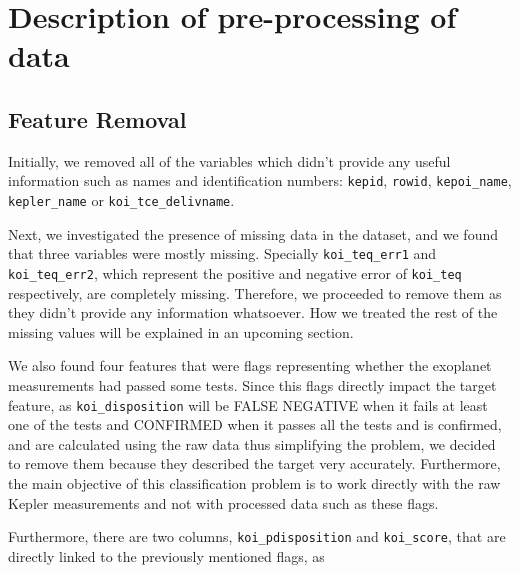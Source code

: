 
\section{Description of pre-processing of data}%
\label{sec:desc-prep}


\subsection{Feature Removal}

Initially, we removed all of the variables which didn't provide any useful information
such as names and identification numbers: \texttt{kepid}, \texttt{rowid}, 
\texttt{kepoi\_name}, \texttt{kepler\_name} or \texttt{koi\_tce\_delivname}.

Next, we investigated the presence of missing data in the dataset, and we found that three
variables were mostly missing. Specially \texttt{koi\_teq\_err1} and 
\texttt{koi\_teq\_err2}, which represent the positive and negative error 
of \texttt{koi\_teq} respectively, are completely missing. Therefore, we proceeded to 
remove them as they didn't provide any information whatsoever. How we treated the rest
of the missing values will be explained in an upcoming section.

We also found four features that were flags representing whether the exoplanet
measurements had passed some tests. Since this flags directly impact the
target feature, as \texttt{koi\_disposition} will be FALSE NEGATIVE when it fails
at least one of the tests and CONFIRMED when it passes all the tests and is confirmed,
and are calculated using the raw data thus simplifying the problem, we decided to 
remove them because they described the target very accurately. Furthermore, the
main objective of this classification problem is to work directly with the raw Kepler
measurements and not with processed data such as these flags.

Furthermore, there are two columns, \texttt{koi\_pdisposition} and \texttt{koi\_score},
that are directly linked to the previously mentioned flags, as \texttt{} 

